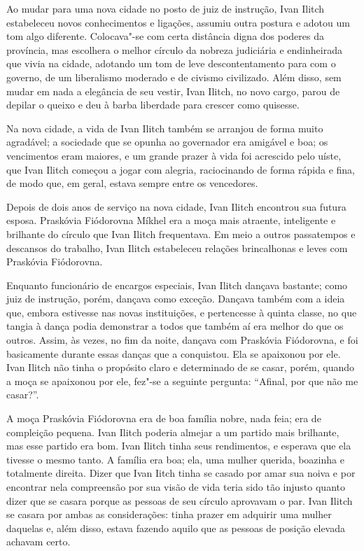Ao mudar para uma nova cidade no posto de juiz de instrução, Ivan Ilitch
estabeleceu novos conhecimentos e ligações, assumiu outra postura e
adotou um tom algo diferente. Colocava"-se com certa distância digna dos
poderes da província, mas escolhera o melhor círculo da nobreza
judiciária e endinheirada que vivia na cidade, adotando um tom de leve
descontentamento para com o governo, de um liberalismo moderado e de
civismo civilizado. Além disso, sem mudar em nada a elegância de seu
vestir, Ivan Ilitch, no novo cargo, parou de depilar o queixo e deu à
barba liberdade para crescer como quisesse.

Na nova cidade, a vida de Ivan Ilitch também se arranjou de forma muito
agradável; a sociedade que se opunha ao governador era amigável e boa;
os vencimentos eram maiores, e um grande prazer à vida foi acrescido
pelo uíste, que Ivan Ilitch começou a jogar com alegria, raciocinando de
forma rápida e fina, de modo que, em geral, estava sempre entre os
vencedores.

Depois de dois anos de serviço na nova cidade, Ivan Ilitch encontrou sua
futura esposa. Praskóvia Fiódorovna Míkhel era a moça mais atraente,
inteligente e brilhante do círculo que Ivan Ilitch frequentava. Em meio
a outros passatempos e descansos do trabalho, Ivan Ilitch estabeleceu
relações brincalhonas e leves com Praskóvia Fiódorovna.

Enquanto funcionário de encargos especiais, Ivan Ilitch dançava
bastante; como juiz de instrução, porém, dançava como exceção. Dançava
também com a ideia que, embora estivesse nas novas instituições, e
pertencesse à quinta classe, no que tangia à dança podia demonstrar a
todos que também aí era melhor do que os outros. Assim, às vezes, no fim
da noite, dançava com Praskóvia Fiódorovna, e foi basicamente durante
essas danças que a conquistou. Ela se apaixonou por ele. Ivan Ilitch não
tinha o propósito claro e determinado de se casar, porém, quando a moça
se apaixonou por ele, fez"-se a seguinte pergunta: ``Afinal, por que não
me casar?''.

A moça Praskóvia Fiódorovna era de boa família nobre, nada feia; era de
compleição pequena. Ivan Ilitch poderia almejar a um partido mais
brilhante, mas esse partido era bom. Ivan Ilitch tinha seus rendimentos,
e esperava que ela tivesse o mesmo tanto. A família era boa; ela, uma
mulher querida, boazinha e totalmente direita. Dizer que Ivan Iitch
tinha se casado por amar sua noiva e por encontrar nela compreensão por
sua visão de vida teria sido tão injusto quanto dizer que se casara
porque as pessoas de seu círculo aprovavam o par. Ivan Ilitch se casara
por ambas as considerações: tinha prazer em adquirir uma mulher daquelas
e, além disso, estava fazendo aquilo que as pessoas de posição elevada
achavam certo.

